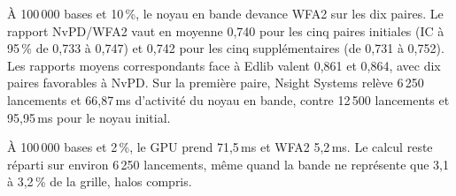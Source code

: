 À 100\,000 bases et 10\,\%, le noyau en bande devance WFA2 sur les dix paires. Le rapport NvPD/WFA2 vaut en moyenne 0,740 pour les cinq paires initiales (IC à 95\,\% de 0,733 à 0,747) et 0,742 pour les cinq supplémentaires (de 0,731 à 0,752). Les rapports moyens correspondants face à Edlib valent 0,861 et 0,864, avec dix paires favorables à NvPD. Sur la première paire, Nsight Systems relève 6\,250 lancements et 66,87\,ms d’activité du noyau en bande, contre 12\,500 lancements et 95,95\,ms pour le noyau initial.

À 100\,000 bases et 2\,\%, le GPU prend 71,5\,ms et WFA2 5,2\,ms. Le calcul reste réparti sur environ 6\,250 lancements, même quand la bande ne représente que 3,1 à 3,2\,\% de la grille, halos compris.

